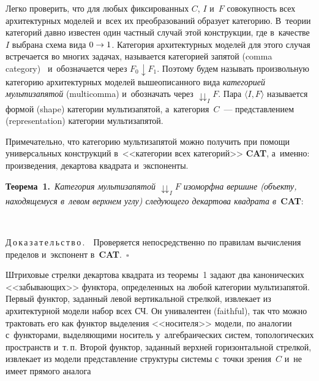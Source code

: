 \begin{multicols}{2}
Легко проверить, что для любых фиксированных $C$, $I$ и~$F$ совокупность 
всех архитектурных моделей и~всех их преобразований образует категорию. 
В~теории категорий давно известен один частный случай этой конструкции, 
где в~качестве~$I$ выбрана схема вида $0\hm\to1$. Категория архитектурных 
моделей для этого случая встречается во многих задачах, называется 
категорией запятой (comma category)~\cite[\S\,II.6]{13-kov} и~обозначается 
через $F_0 \downarrow F_1$. Поэтому будем называть произвольную категорию 
архитектурных моделей вышеописанного вида \textit{категорией 
мультизапятой} (multicomma) и~обозначать через $\downdownarrows_I F$. 
Пара $\langle I, F\rangle $ называется формой (shape) категории мультизапятой, 
а~категория~$C$~--- пред\-став\-ле\-ни\-ем (representation) категории мультизапятой.
{

}

Примечательно, что категорию мультизапятой можно получить при помощи 
универсальных конструкций в~<<категории всех категорий>> \textbf{CAT}, 
а~именно: произведения, декартова квад\-ра\-та и~экс\-по\-ненты.

\smallskip

\noindent
\textbf{Теорема~1.}~\textit{Категория муль\-ти\-за\-пя\-той $\downdownarrows_I F$ 
изо\-морф\-на вершине (объекту, находящемуся в~левом верх\-нем углу) 
сле\-ду\-юще\-го декартова квад\-ра\-та в}~\textbf{CAT}:

{ \begin{center} %
\vspace*{1pt}

\mbox{%
\epsfxsize=41.337mm 
}
\end{center}
\vspace*{3pt}

}

\noindent
Д\,о\,к\,а\,з\,а\,т\,е\,л\,ь\,с\,т\,в\,о\,.\ \  Проверяется непосредственно по правилам 
вы\-чис\-ле\-ния пределов и~экспонент в~\textbf{CAT}.~$\square$

\smallskip

Штриховые стрелки декартова квадрата из тео\-ре\-мы~1 задают два 
канонических <<забывающих>> функтора, определенных на любой категории 
мультизапятой. Первый функтор, заданный левой вертикальной стрелкой, 
извлекает из архитектурной модели набор всех СЧ. Он унивалентен (faithful), 
так что можно трактовать его как функтор выделения <<носителя>> модели, по 
аналогии с~функторами, выделяющими носитель у~алгебраических сис\-тем, 
топологических пространств и~т.\,п. Второй функтор, заданный верхней 
горизонтальной стрелкой, извлекает из модели пред\-став\-ле\-ние структуры 
сис\-те\-мы с~точ\-ки зрения~$C$ и~не имеет прямого аналога\linebreak\vspace*{-12pt}


\end{multicols}
